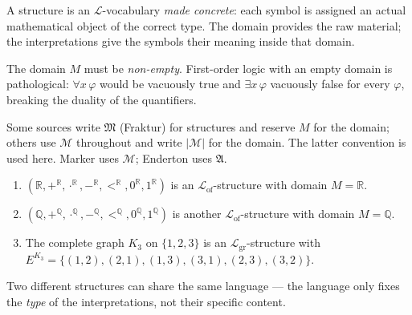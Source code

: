 \begin{remark*}[Intuition]
A structure is an $\mathcal{L}$-vocabulary \emph{made concrete}: each
symbol is assigned an actual mathematical object of the correct type.
The domain provides the raw material; the interpretations give the
symbols their meaning inside that domain.
\end{remark*}

\begin{remark*}
The domain $M$ must be \emph{non-empty}. First-order logic with an empty
domain is pathological: $\forall x\, \varphi$ would be vacuously true
and $\exists x\, \varphi$ vacuously false for every $\varphi$, breaking
the duality of the quantifiers.
\end{remark*}

\begin{remark*}
Some sources write $\mathfrak{M}$ (Fraktur) for structures and reserve
$M$ for the domain; others use $\mathcal{M}$ throughout and write
$|\mathcal{M}|$ for the domain. The latter convention is used here.
Marker uses $\mathcal{M}$; Enderton uses $\mathfrak{A}$.
\end{remark*}


\begin{example*}
\begin{enumerate}
  \item $(\mathbb{R}, +^{\mathbb{R}}, \cdot^{\mathbb{R}}, -^{\mathbb{R}},
         <^{\mathbb{R}}, 0^{\mathbb{R}}, 1^{\mathbb{R}})$
        is an $\mathcal{L}_{\mathrm{of}}$-structure with domain
        $M = \mathbb{R}$.

  \item $(\mathbb{Q}, +^{\mathbb{Q}}, \cdot^{\mathbb{Q}}, -^{\mathbb{Q}},
         <^{\mathbb{Q}}, 0^{\mathbb{Q}}, 1^{\mathbb{Q}})$
        is another $\mathcal{L}_{\mathrm{of}}$-structure with domain
        $M = \mathbb{Q}$.

  \item The complete graph $K_3$ on $\{1,2,3\}$ is an
        $\mathcal{L}_{\mathrm{gr}}$-structure with
        $E^{K_3} = \{(1,2),(2,1),(1,3),(3,1),(2,3),(3,2)\}$.
\end{enumerate}
Two different structures can share the same language — the language only
fixes the \emph{type} of the interpretations, not their specific content.
\end{example*}


